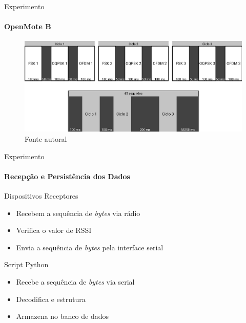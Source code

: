 \documentclass[c]{beamer}
\begin{document}
\begin{darkframes}
  \begin{frame}{Experimento}
    \framesubtitle{OpenMote B}
    \begin{figure}
      \centering
      \includegraphics[width=\textwidth]{resources/ciclos.png}\\
      \footnotesize{Fonte autoral}
    \end{figure}
  \end{frame}

  \begin{frame}{Experimento}
    \framesubtitle{Recepção e Persistência dos Dados}
    \begin{block}{Dispositivos Receptores}
      \begin{itemize}
        \item \alert{Recebem} a sequência de \emph{bytes} via rádio
        \item \alert{Verifica} o valor de RSSI
        \item \alert{Envia} a sequência de \emph{bytes} pela interface serial
      \end{itemize}
    \end{block}

    \begin{block}{Script Python}
      \begin{itemize}
        \item \alert{Recebe} a sequência de \emph{bytes} via serial
        \item \alert{Decodifica} e \alert{estrutura}
        \item \alert{Armazena} no banco de dados
      \end{itemize}
    \end{block}
  \end{frame}


\end{darkframes}
\end{document}
